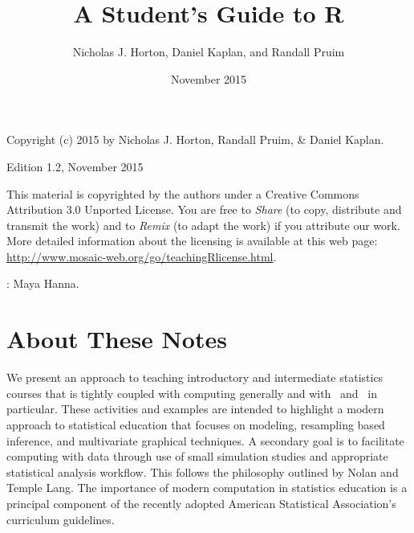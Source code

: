 \documentclass{tufte-book}\usepackage[]{graphicx}\usepackage[]{xcolor}
\title{A Student's Guide to R}
\author[Horton, Kaplan, Pruim]{ Nicholas J. Horton, Daniel Kaplan, and Randall Pruim}
\date{November 2015}
\begin{document}
\def\cplabel{^X} 

\def\tilde{\texttt{\~}}
\renewenvironment{knitrout}{}{\noindent\ignorespaces\!\!}







\newpage
\vspace*{2in}

\parbox{4in}{\noindent Copyright (c) 2015 by Nicholas J. Horton, Randall Pruim, \& Daniel Kaplan.}
\medskip

\parbox{4in}{\noindent Edition 1.2, November 2015}

\bigskip

\parbox{4in}{\noindent This material is copyrighted by the authors under a Creative Commons Attribution 3.0 Unported License. You are free to \emph{Share} (to copy, distribute and transmit the work) and to \emph{Remix} (to adapt the work) if you attribute our work. More detailed information about the licensing is available at this web page:
\url{http://www.mosaic-web.org/go/teachingRlicense.html}.
}


\vspace*{2.in}

\parbox{4in}{: Maya Hanna.}


\hspace*{1.3cm}\tableofcontents






\chapter*{About These Notes}


We present an approach to teaching introductory and intermediate
statistics courses that is tightly coupled with computing generally and with \R\ and \RStudio\ in particular. These activities and examples are intended to highlight a modern approach to statistical education that focuses on modeling, resampling based inference, and multivariate graphical techniques.  A secondary goal is to
facilitate computing with data through use of small simulation studies %
and appropriate statistical analysis workflow. This follows the
philosophy outlined by Nolan and Temple Lang\cite{nola:temp:2010}. The importance of modern computation\marginnote{$\ $} in statistics education is a principal component of the recently adopted American Statistical Association's curriculum guidelines\cite{ASAcurriculum2014}.
\end{document}
